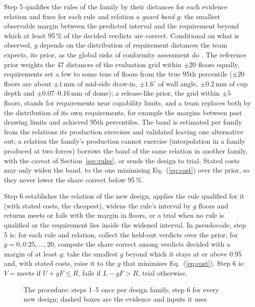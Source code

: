 \documentclass[pdflatex,sn-basic,lineno]{sn-jnl}
\begin{document}
Step 5 qualifies the rules of the family by their distances for each evidence relation and fixes for each rule and relation a \emph{guard band} $g$: the smallest observable margin between the predicted interval and the requirement beyond which at least 95\,\% of the decided verdicts are correct. Conditional on what is observed, $g$ depends on the distribution of requirement distances the team expects, its prior, as the global risks of conformity assessment do \citep{jcgm2012evaluation}. The reference prior weights the 47 distances of the evaluation grid within $\pm20$ floors equally, requirements set a few to some tens of floors from the true 95th percentile ($\pm20$ floors are about $\pm1$\,mm of mid-side draw-in, $\pm1.6^\circ$ of wall angle, $\pm0.2$\,mm of cup depth and $\pm0.07$--0.16\,mm of dome); a release-like prior, the grid within $\pm5$ floors, stands for requirements near capability limits, and a team replaces both by the distribution of its own requirements, for example the margins between past drawing limits and achieved 95th percentiles. The band is estimated per family from the relations its production exercises and validated leaving one alternative out; a relation the family's production cannot exercise (interpolation in a family produced at two forces) borrows the band of the same relation in another family, with the caveat of Section~\ref{sec:rules}, or sends the design to trial. Stated costs may only widen the band, to the one minimising Eq.~(\ref{eq:cost}) over the prior, so they never lower the share correct below 95\,\%.

Step 6 establishes the relation of the new design, applies the rule qualified for it (with stated costs, the cheapest), widens the rule's interval by $g$ floors and returns meets or fails with the margin in floors, or a trial when no rule is qualified or the requirement lies inside the widened interval. In pseudocode, step 5 is: for each rule and relation, collect the held-out verdicts over the prior; for $g = 0, 0.25, \ldots, 20$, compute the share correct among verdicts decided with a margin of at least $g$; take the smallest $g$ beyond which it stays at or above 0.95 and, with stated costs, raise it to the $g$ that minimises Eq.~(\ref{eq:cost}). Step 6 is: $V = \text{meets}$ if $U+gF\le R$, fails if $L-gF>R$, trial otherwise.

\begin{figure}[t]
\centering

\caption{The procedure: steps 1--5 once per design family, step 6 for every new design; dashed boxes are the evidence and inputs it uses}\label{fig:procedure}
\end{figure}
\end{document}
